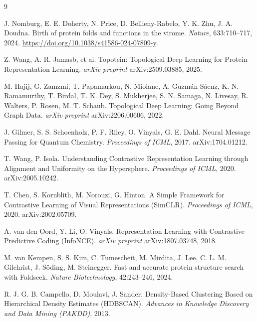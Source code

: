 \documentclass[11pt,a4paper]{article}
\theoremstyle{definition}
\begin{document}
\begin{thebibliography}{9}

J. Nomburg, E. E. Doherty, N. Price, D. Bellieny-Rabelo, Y. K. Zhu, J. A. Doudna.
\newblock Birth of protein folds and functions in the virome.
\newblock \emph{Nature}, 633:710--717, 2024.
\newblock \url{https://doi.org/10.1038/s41586-024-07809-y}.

Z. Wang, A. R. Jamasb, et al.
\newblock Topotein: Topological Deep Learning for Protein Representation Learning.
\newblock \emph{arXiv preprint} arXiv:2509.03885, 2025.

M. Hajij, G. Zamzmi, T. Papamarkou, N. Miolane, A. Guzm\'an-S\'aenz,
K. N. Ramamurthy, T. Birdal, T. K. Dey, S. Mukherjee, S. N. Samaga, N. Livesay,
R. Walters, P. Rosen, M. T. Schaub.
\newblock Topological Deep Learning: Going Beyond Graph Data.
\newblock \emph{arXiv preprint} arXiv:2206.00606, 2022.

J. Gilmer, S. S. Schoenholz, P. F. Riley, O. Vinyals, G. E. Dahl.
\newblock Neural Message Passing for Quantum Chemistry.
\newblock \emph{Proceedings of ICML}, 2017. arXiv:1704.01212.

T. Wang, P. Isola.
\newblock Understanding Contrastive Representation Learning through Alignment and
Uniformity on the Hypersphere.
\newblock \emph{Proceedings of ICML}, 2020. arXiv:2005.10242.

T. Chen, S. Kornblith, M. Norouzi, G. Hinton.
\newblock A Simple Framework for Contrastive Learning of Visual Representations
(SimCLR).
\newblock \emph{Proceedings of ICML}, 2020. arXiv:2002.05709.

A. van den Oord, Y. Li, O. Vinyals.
\newblock Representation Learning with Contrastive Predictive Coding (InfoNCE).
\newblock \emph{arXiv preprint} arXiv:1807.03748, 2018.

M. van Kempen, S. S. Kim, C. Tumescheit, M. Mirdita, J. Lee, C. L. M. Gilchrist,
J. S\"oding, M. Steinegger.
\newblock Fast and accurate protein structure search with Foldseek.
\newblock \emph{Nature Biotechnology}, 42:243--246, 2024.

R. J. G. B. Campello, D. Moulavi, J. Sander.
\newblock Density-Based Clustering Based on Hierarchical Density Estimates
(HDBSCAN).
\newblock \emph{Advances in Knowledge Discovery and Data Mining (PAKDD)}, 2013.

\end{thebibliography}
\end{document}
